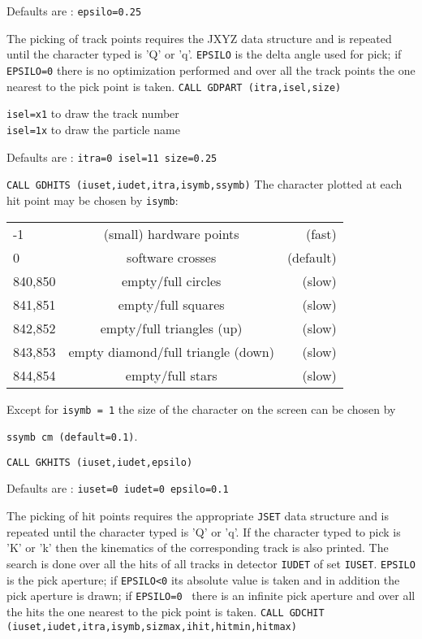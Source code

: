 Defaults are : {\tt epsilo=0.25}
 
The picking of track points requires the JXYZ data structure
and is  repeated until the character typed is 'Q' or 'q'.
{\tt EPSILO} is the delta angle used for pick; if {\tt EPSILO=0}
there is no optimization performed and
over all the track points the one nearest to the pick
point is taken.
{\tt CALL GDPART (itra,isel,size)}
 
{\tt isel=x1} to draw the track number\\
{\tt isel=1x} to draw the particle name
 
Defaults are : {\tt itra=0  isel=11  size=0.25}
 
{\tt CALL GDHITS (iuset,iudet,itra,isymb,ssymb)}
The character plotted at each hit point may be chosen by {\tt isymb}:
\begin{center}\begin{tabular} {lcr}
-1              &(small) hardware points            &(fast)\\
0               &software crosses                   &(default)\\
840,850         &empty/full circles                 &(slow) \\
841,851         &empty/full squares                 &(slow)\\
842,852         &empty/full triangles (up)          &(slow)\\
843,853         &empty diamond/full triangle (down) &(slow)\\
844,854         &empty/full stars                   &(slow)\\
\end{tabular} \end{center}
 
Except for {\tt isymb = 1} the size of the character on the screen can be
chosen by
 
{\tt ssymb cm (default=0.1)}.
 
{\tt CALL GKHITS (iuset,iudet,epsilo)}
 
Defaults are : {\tt iuset=0 iudet=0 epsilo=0.1}
 
The picking of hit points requires the appropriate {\tt JSET} data structure
and is  repeated until the character typed is 'Q' or 'q'.
If the character typed to pick is 'K' or 'k' then the
kinematics of the corresponding track is also printed.
The search is done over all the hits of all tracks in
detector {\tt IUDET} of set {\tt IUSET}.
{\tt EPSILO} is the pick aperture; if {\tt EPSILO<0} its absolute value is taken
and in addition the pick aperture is drawn; if {\tt EPSILO=0 }
there is an infinite pick aperture and
over all the hits the one nearest to the pick point is taken.
{\tt CALL GDCHIT (iuset,iudet,itra,isymb,sizmax,ihit,hitmin,hitmax)}
 
